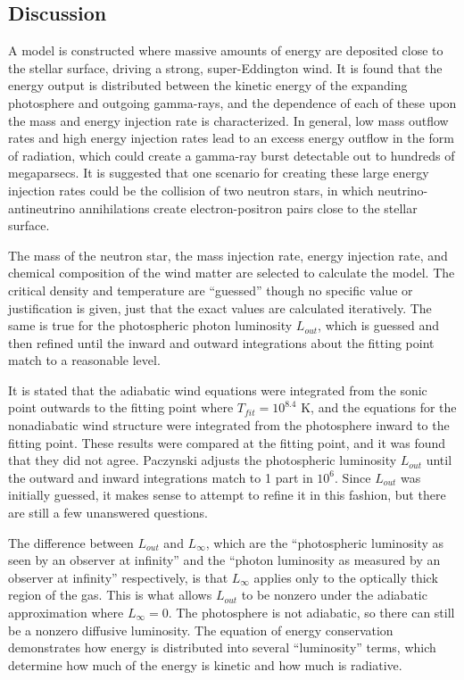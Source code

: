 \documentclass[onecolumn]{aastex63}
\begin{document}
\subsection{Discussion}

A model is constructed where massive amounts of energy are deposited close to the stellar surface, driving a strong, super-Eddington wind. It is found that the energy output is distributed between the kinetic energy of the expanding photosphere and outgoing gamma-rays, and the dependence of each of these upon the mass and energy injection rate is characterized. In general, low mass outflow rates and high energy injection rates lead to an excess energy outflow in the form of radiation, which could create a gamma-ray burst detectable out to hundreds of megaparsecs. It is suggested that one scenario for creating these large energy injection rates could be the collision of two neutron stars, in which neutrino-antineutrino annihilations create electron-positron pairs close to the stellar surface.

The mass of the neutron star, the mass injection rate, energy injection rate, and chemical composition of the wind matter are selected to calculate the model. The critical density and temperature are ``guessed'' though no specific value or justification is given, just that the exact values are calculated iteratively. The same is true for the photospheric photon luminosity $L_{out}$, which is guessed and then refined until the inward and outward integrations about the fitting point match to a reasonable level. 

It is stated that the adiabatic wind equations were integrated from the sonic point outwards to the fitting point where $T_{fit} = 10^{8.4}$ K, and the equations for the nonadiabatic wind structure were integrated from the photosphere inward to the fitting point. These results were compared at the fitting point, and it was found that they did not agree. Paczynski adjusts the photospheric luminosity $L_{out}$ until the outward and inward integrations match to 1 part in $10^6$. Since $L_{out}$ was initially guessed, it makes sense to attempt to refine it in this fashion, but there are still a few unanswered questions.

The difference between $L_{out}$ and $L_\infty$, which are the ``photospheric luminosity as seen by an observer at infinity'' and the ``photon luminosity as measured by an observer at infinity'' respectively, is that $L_{\infty}$ applies only to the optically thick region of the gas. This is what allows $L_{out}$ to be nonzero under the adiabatic approximation where $L_\infty = 0$. The photosphere is not adiabatic, so there can still be a nonzero diffusive luminosity. The equation of energy conservation demonstrates how energy is distributed into several ``luminosity'' terms, which determine how much of the energy is kinetic and how much is radiative.
\end{document}
